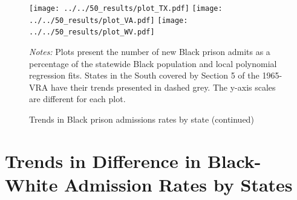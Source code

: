 \documentclass[12pt]{article}
\begin{document}
 \begin{figure}[h!]
 	\begin{center}
 	\caption{Trends in Black prison admissions rates by state (continued)}
 	\small

 		\vspace{.2in}

 			\texttt{[image: ../../50\_results/plot\_TX.pdf]}
 			\texttt{[image: ../../50\_results/plot\_VA.pdf]}
       \texttt{[image: ../../50\_results/plot\_WV.pdf]} \\
 	\label{figure_states2}
 	\end{center}
   {\scriptsize{\emph{Notes:} Plots present the number of new Black prison admits as a percentage of the statewide Black population and local polynomial regression fits.  States in the South covered by Section 5 of the 1965-VRA have their trends presented in dashed grey.  The y-axis scales are different for each plot.}}
 \end{figure} \normalsize











 \clearpage \newpage
 \section{Trends in Difference in Black-White Admission Rates by States}\label{appendix_diff_rates_states}
 \setcounter{table}{0}
 \setcounter{figure}{0}
 \renewcommand{\thetable}{D\arabic{table}}
 \renewcommand{\thefigure}{D\arabic{figure}}
 \normalsize
\end{document}
